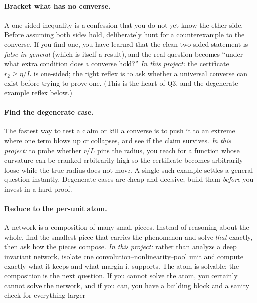 \paragraph{Bracket what has no converse.} A one-sided inequality is a confession that you do not yet
know the other side. Before assuming both sides hold, deliberately hunt for a counterexample to the
converse. If you find one, you have learned that the clean two-sided statement is \emph{false in
general} (which is itself a result), and the real question becomes ``under what extra condition
does a converse hold?'' \emph{In this project:} the certificate $r_2 \ge \eta/L$ is one-sided; the
right reflex is to ask whether a universal converse can exist before trying to prove one. (This is
the heart of Q3, and the degenerate-example reflex below.)

\paragraph{Find the degenerate case.} The fastest way to test a claim or kill a converse is to push
it to an extreme where one term blows up or collapses, and see if the claim survives. \emph{In this
project:} to probe whether $\eta/L$ pins the radius, you reach for a function whose curvature can be
cranked arbitrarily high so the certificate becomes arbitrarily loose while the true radius does not
move. A single such example settles a general question instantly. Degenerate cases are cheap and
decisive; build them \emph{before} you invest in a hard proof.

\paragraph{Reduce to the per-unit atom.} A network is a composition of many small pieces. Instead of
reasoning about the whole, find the smallest piece that carries the phenomenon and solve \emph{that}
exactly, then ask how the pieces compose. \emph{In this project:} rather than analyze a deep
invariant network, isolate one convolution--nonlinearity--pool unit and compute exactly what it keeps
and what margin it supports. The atom is solvable; the composition is the next question. If you
cannot solve the atom, you certainly cannot solve the network, and if you can, you have a building
block and a sanity check for everything larger.

